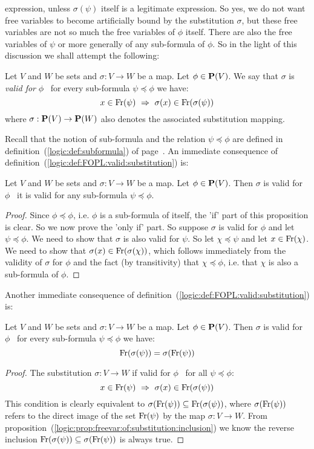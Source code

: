 expression, unless $\sigma(\psi)$ itself is a legitimate expression.
So yes, we do not want free variables to become artificially bound
by the substitution $\sigma$, but these free variables are not so
much the free variables of $\phi$ itself. There are also the free
variables of $\psi$ or more generally of any sub-formula of $\phi$.
So in the light of this discussion we shall attempt the following:
\begin{defin}\label{logic:def:FOPL:valid:substitution}
    Let $V$ and $W$ be sets and $\sigma:V\to W$ be a map. Let
    $\phi\in\mbox{${\bf P}(V)$}$. We say that $\sigma$ is {\em valid for} $\phi$ \ifand\
    for every sub-formula $\psi\preceq\phi$ we have:
    \[
        x\in\free(\psi)\ \Rightarrow\ \sigma(x)\in\free(\sigma(\psi))
    \]
    where $\sigma:\mbox{${\bf P}(V)$}\to{\bf P}(W)$ also denotes the associated substitution 
    mapping.
\end{defin}
Recall that the notion of sub-formula and the relation
$\psi\preceq\phi$ are defined in
definition~(\ref{logic:def:subformula}) of
page~\pageref{logic:def:subformula}. An immediate consequence of
definition~(\ref{logic:def:FOPL:valid:substitution}) is:
\begin{prop}\label{logic:prop:FOPL:valid:subformula}
Let $V$ and $W$ be sets and $\sigma:V\to W$ be a map. Let
$\phi\in\mbox{${\bf P}(V)$}$. Then $\sigma$ is valid for $\phi$ \ifand\ it is valid
for any sub-formula $\psi\preceq\phi$.
\end{prop}
\begin{proof}
Since $\phi\preceq\phi$, i.e. $\phi$ is a sub-formula of itself, the
'if' part of this proposition is clear. So we now prove the 'only
if' part. So suppose $\sigma$ is valid for $\phi$ and let
$\psi\preceq\phi$. We need to show that $\sigma$ is also valid for
$\psi$. So let $\chi\preceq\psi$ and let $x\in\mbox{\rm Fr}(\chi)$. We need
to show that $\sigma(x)\in\mbox{\rm Fr}(\sigma(\chi))$, which follows
immediately from the validity of $\sigma$ for $\phi$ and the fact
(by transitivity) that $\chi\preceq\phi$, i.e. that $\chi$ is also a
sub-formula of $\phi$.
\end{proof}

Another immediate consequence of
definition~(\ref{logic:def:FOPL:valid:substitution}) is:
\begin{prop}\label{logic:prop:FOPL:valid:free:commute}
Let $V$ and $W$ be sets and $\sigma:V\to W$ be a map. Let
$\phi\in\mbox{${\bf P}(V)$}$. Then $\sigma$ is valid for $\phi$ \ifand\ for every
sub-formula $\psi\preceq\phi$ we have:
    \[
    \mbox{\rm Fr}(\sigma(\psi)) =\sigma(\mbox{\rm Fr}(\psi))
    \]
\end{prop}
\begin{proof}
The substitution $\sigma:V\to W$ if valid for $\phi$ \ifand\ for all
$\psi\preceq\phi$:
    \[
    x\in\free(\psi)\ \Rightarrow\ \sigma(x)\in\free(\sigma(\psi))
    \]
This condition is clearly equivalent to
$\sigma(\mbox{\rm Fr}(\psi))\subseteq\mbox{\rm Fr}(\sigma(\psi))$, where
$\sigma(\mbox{\rm Fr}(\psi))$ refers to the direct image of the set
$\mbox{\rm Fr}(\psi)$ by the map $\sigma:V\to W$. From
proposition~(\ref{logic:prop:freevar:of:substitution:inclusion}) we
know the reverse inclusion
$\mbox{\rm Fr}(\sigma(\psi))\subseteq\sigma(\mbox{\rm Fr}(\psi))$ is always true.
\end{proof}

